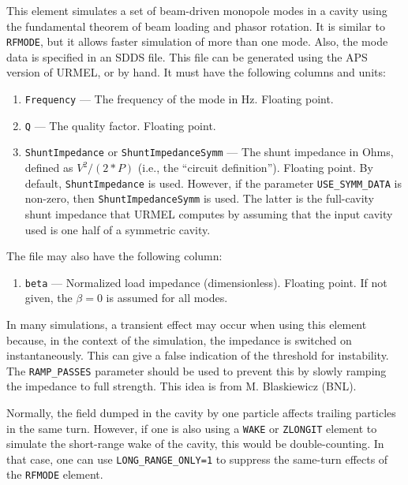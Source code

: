 This element simulates a set of beam-driven monopole modes in a cavity using the fundamental theorem of beam loading and phasor rotation.
It is similar to {\tt RFMODE}, but it allows faster simulation of more than
one mode.  Also, the mode data is specified in an SDDS file.  This file can be
generated using the APS version of URMEL, or by hand. It must have the following
columns and units:
\begin{enumerate}
\item {\tt Frequency} --- The frequency of the mode in Hz.  Floating point.
\item {\tt Q} --- The quality factor.  Floating point.
\item {\tt ShuntImpedance} or {\tt ShuntImpedanceSymm} --- The shunt
  impedance in Ohms, defined as $V^2/(2*P)$ (i.e., the ``circuit definition'').
  Floating point. By default, {\tt ShuntImpedance} is
  used.  However, if the parameter \verb|USE_SYMM_DATA| is non-zero, then 
  {\tt ShuntImpedanceSymm}  is used.  The latter is the full-cavity 
  shunt impedance that URMEL computes
  by assuming that the input cavity used is one half of a symmetric cavity.
\end{enumerate}

The file may also have the following column:
\begin{enumerate}
\item {\tt beta} --- Normalized load impedance (dimensionless).   Floating point.  If not given, the
 $\beta=0$ is assumed for all modes.
\end{enumerate}

In many simulations, a transient effect may occur when using this
element because, in the context of the simulation, the impedance is
switched on instantaneously.  This can give a false indication of the
threshold for instability. The {\tt RAMP\_PASSES} parameter should
be used to prevent this by slowly ramping the impedance to full
strength.  This idea is from M. Blaskiewicz (BNL).

Normally, the field dumped in the cavity by one particle affects trailing particles in the same turn.
However, if one is also using a \verb|WAKE| or \verb|ZLONGIT| element to simulate the short-range wake of the cavity, this would be double-counting.
In that case, one can use \verb|LONG_RANGE_ONLY=1| to suppress the same-turn effects of the \verb|RFMODE| element.
